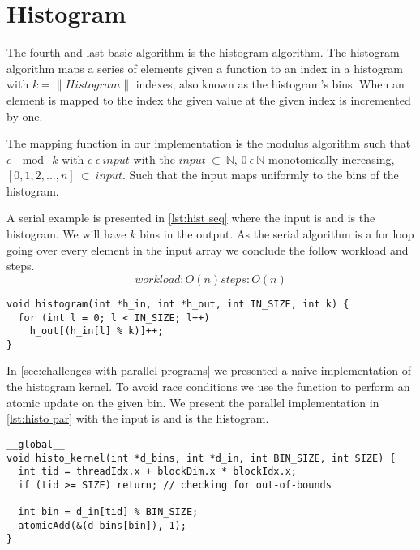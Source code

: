 \section{Histogram}
\label{sec:histogram}

The fourth and last basic algorithm is the histogram algorithm.
The histogram algorithm maps a series of elements given a function to an index in a histogram with $k = \|Histogram\|$ indexes, also known as the histogram's bins.
When an element is mapped to the index the given value at the given index is incremented by one.

The mapping function in our implementation is the modulus algorithm such that $e\ \mod\ k$ with $e\ \epsilon\ input$ with the $input\ \subset\ \mathbb{N}$, $0\ \epsilon\ \mathbb{N}$ monotonically increasing, $[0, 1, 2, ..., n]\ \subset\ input$.
Such that the input maps uniformly to the bins of the histogram.

A serial example is presented in \cref{lst:hist seq} where the input is  and  is the histogram.
We will have $k$ bins in the output.
As the serial algorithm is a for loop going over every element in the input array we conclude the follow workload and steps.
\begin{equation*}
work load: O(n)
steps: O(n)
\end{equation*}

\begin{lstlisting}[caption={Serial histogram}, label={lst:hist seq}]
void histogram(int *h_in, int *h_out, int IN_SIZE, int k) {
  for (int l = 0; l < IN_SIZE; l++) 
    h_out[(h_in[l] % k)]++;
}
\end{lstlisting}

In \cref{sec:challenges with parallel programs} we presented a naive implementation of the histogram kernel.
To avoid race conditions we use the  function to perform an atomic update on the given bin.
We present the parallel implementation in \cref{lst:histo par} with the input is  and  is the histogram.

\begin{lstlisting}[caption={Simple parallel histogram implementation}, label={lst:histo par}]
__global__ 
void histo_kernel(int *d_bins, int *d_in, int BIN_SIZE, int SIZE) {
  int tid = threadIdx.x + blockDim.x * blockIdx.x;
  if (tid >= SIZE) return; // checking for out-of-bounds

  int bin = d_in[tid] % BIN_SIZE;
  atomicAdd(&(d_bins[bin]), 1);
}
\end{lstlisting}

